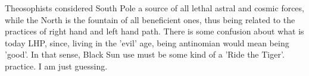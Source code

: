 \begin{footnotesize}
\begin{sffamily}
Theosophists considered South Pole a source of all lethal astral and cosmic forces, while the North is the fountain of all beneficient ones, thus being related to the practices of right hand and left hand path. There is some confusion about what is today LHP, since, living in the 'evil' age, being antinomian would mean being 'good’. In that sense, Black Sun use must be some kind of a 'Ride the Tiger'. practice. I am just guessing.


\hfill


\end{sffamily}\end{footnotesize}
